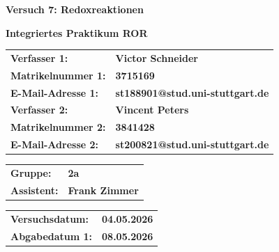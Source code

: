 \documentclass[12pt]{scrartcl} %
\begin{document}

\begin{titlepage}
\begin{center}
\vspace*{2cm}
\begin{LARGE}
\vspace*{1cm}
\textbf{\textsf{Versuch 7: Redoxreaktionen\\}}
\end{LARGE}
\vspace*{1cm}
\textbf{\textsf{Integriertes Praktikum ROR}}\\
\vspace*{1.5cm}


\begin{table}[H]
\sffamily

\hspace*{3cm}\begin{tabular}{>{\bfseries}l>{\bfseries}l}
Verfasser 1: & Victor Schneider\\
Matrikelnummer 1: & 3715169\\
E-Mail-Adresse 1: & st188901@stud.uni-stuttgart.de\\
Verfasser 2: & Vincent Peters\\
Matrikelnummer 2: & 3841428\\
E-Mail-Adresse 2: & st200821@stud.uni-stuttgart.de\\
\end{tabular}
\vspace{1cm}

\hspace*{3cm}\begin{tabular}{>{\bfseries}l>{\bfseries}l}
    Gruppe: & 2a \\
    Assistent: & Frank Zimmer
\end{tabular}
\vspace{1cm}

\hspace*{3cm}\begin{tabular}{>{\bfseries}l>{\bfseries}l}
   Versuchsdatum: & 04.05.2026 \\
   Abgabedatum 1: & 08.05.2026 \\ 
\end{tabular}
\end{table}
\end{center}

\end{titlepage}


\renewcommand{\thepage}{\Roman{page}}\setcounter{page}{1}
\tableofcontents %
\newpage
\renewcommand{\thepage}{\arabic{page}}\setcounter{page}{1}
\end{document}
